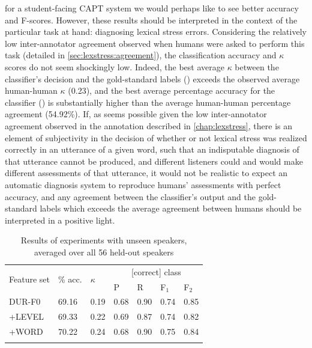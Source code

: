  for a student-facing CAPT system we would perhaps like to see better accuracy and F-scores. However, these results should be interpreted in the context of the particular task at hand: diagnosing lexical stress errors. Considering the relatively low inter-annotator agreement observed when humans were asked to perform this task (detailed in \cref{sec:lexstress:agreement}), the classification accuracy and $\kappa$ scores do not seem shockingly low. Indeed, the best average $\kappa$ between the classifier's decision and the gold-standard labels (\TODO{}) exceeds the observed average human-human $\kappa$ (0.23), and the best average percentage accuracy for the classifier (\TODO{}) is substantially higher than the average human-human percentage agreement (54.92\%).
		 If, as seems possible given the low inter-annotator agreement observed in the annotation described in \cref{chap:lexstress}, there is an element of subjectivity in the decision of whether or not lexical stress was realized correctly in an utterance of a given word, such that an indisputable diagnosis of that utterance cannot be produced, and different listeners could and would make different assessments of that utterance, it would not be realistic to expect an automatic diagnosis system to reproduce humans' assessments with perfect accuracy, and any agreement between the classifier's output and the gold-standard labels which exceeds the average agreement between humans should be interpreted in a positive light. 


\begin{table}
			\centering
			\caption[Results of experiments with unseen speakers]{Results of experiments with unseen speakers, averaged over all 56 held-out speakers  }
			\begin{tabularx}{\textwidth}{lXXXXXX}			
			\toprule
			\multirow{2}{*}{Feature set} & \multirow{2}{*}{\% acc.} & \multirow{2}{*}{$\kappa$} & \multicolumn{4}{c}{[correct] class} \\
			\cmidrule(lr){4-7}
			& & & P & R & F$_1$ & F$_2$ \\
			\midrule
DUR-F0	&	69.16	&	0.19	&	0.68	&	0.90	&	0.74	&	0.85	\\
{+LEVEL}	&	69.33	&	0.22	&	0.69	&	0.87	&	0.74	&	0.82	\\
{+WORD}	&	70.22	&	0.24	&	0.68	&	0.90	&	0.75	&	0.84	\\							
			\bottomrule
			\label{tab:results:speakers}
			\end{tabularx}
		\end{table}
	

